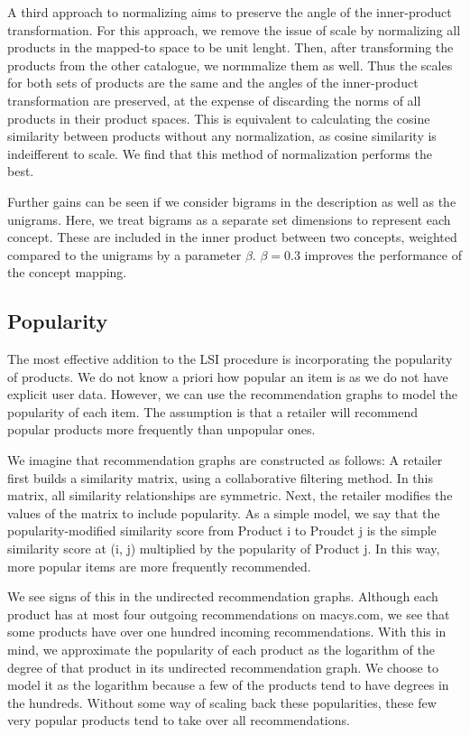 \documentclass[11pt]{article}
\begin{document}
A third approach to normalizing aims to preserve the angle of the inner-product
transformation. For this approach, we remove the issue of scale by normalizing
all products in the mapped-to space to be unit lenght. Then, after transforming
the products from the other catalogue, we normmalize them as well. Thus the
scales for both sets of products are the same and the angles of the
inner-product transformation are preserved, at the expense of discarding the
norms of all products in their product spaces. This is equivalent to calculating
the cosine similarity between products without any normalization, as cosine
similarity is indeifferent to scale. We find that this method of normalization
performs the best.

Further gains can be seen if we consider bigrams in the description as well as
the unigrams. Here, we treat bigrams as a separate set dimensions to represent
each concept. These are included in the inner product between two concepts,
weighted compared to the unigrams by a parameter $\beta$. $\beta = 0.3$ improves the
performance of the concept mapping.

\subsection*{Popularity}
The most effective addition to the LSI procedure is incorporating the popularity
of products. We do not know a priori how popular an item is as we do not have
explicit user data. However, we can use the recommendation graphs to model the
popularity of each item. The assumption is that a retailer will recommend
popular products more frequently than unpopular ones.

We imagine that recommendation graphs are constructed as follows: A retailer first
builds a similarity matrix, using a collaborative filtering method. In this
matrix, all similarity relationships are symmetric. Next, the retailer modifies
the values of the matrix to include popularity. As a simple model, we say that
the popularity-modified similarity score from Product i to Proudct j is the
simple similarity score at (i, j) multiplied by the popularity of Product j. In
this way, more popular items are more frequently recommended. 

We see signs of this in the undirected recommendation graphs. Although each product
has at most four outgoing recommendations on macys.com, we see that some
products have over one hundred incoming recommendations. With this in mind, we
approximate the popularity of each product as the logarithm of the degree of
that product in its undirected recommendation graph. We choose to model it as the
logarithm because a few of the products tend to have degrees in the hundreds.
Without some way of scaling back these popularities, these few very popular
products tend to take over all recommendations.
\end{document}
